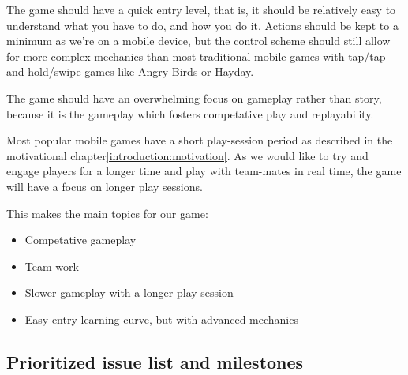 The game should have a quick entry level, that is, it should be relatively easy to understand what you have to do, and how you do it. Actions should be kept to a minimum as we're on a mobile device, but the control scheme should still allow for more complex mechanics than most traditional mobile games with tap/tap-and-hold/swipe games like Angry Birds\cite{angrybirds} or Hayday\cite{hayday}. 

The game should have an overwhelming focus on gameplay rather than story, because it is the gameplay which fosters competative play and replayability. 

Most popular mobile games have a short play-session period as described in the motivational chapter\ref{introduction:motivation}. As we would like to try and engage players for a longer time and play with team-mates in real time, the game will have a focus on longer play sessions.

This makes the main topics for our game:
\begin{itemize}
\item Competative gameplay
\item Team work
\item Slower gameplay with a longer play-session
\item Easy entry-learning curve, but with advanced mechanics
\end{itemize}

\subsection{Prioritized issue list and milestones}